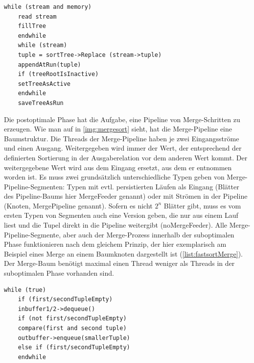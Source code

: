 \documentclass[a4paper,12pt,twoside]{article}
\begin{document}
\begin{minipage}{\linewidth}
	\begin{lstlisting}[caption={Fastsort: Erzeugen der Runs in der Suboptimalen Phase}, label=list:fastsortSub] 
	while (stream and memory) 
	read stream
	fillTree
	endwhile
	while (stream)
	tuple = sortTree->Replace (stream->tuple)
	appendAtRun(tuple)
	if (treeRootIsInactive)
	setTreeAsActive
	endwhile
	saveTreeAsRun
	\end{lstlisting}
\end{minipage}

Die postoptimale Phase hat die Aufgabe, eine Pipeline von Merge-Schritten zu erzeugen. Wie man auf in \autoref{img:mergesort} sieht, hat die Merge-Pipeline eine Baumstruktur. Die Threads der Merge-Pipeline haben je zwei Eingangsströme und einen Ausgang. Weitergegeben wird immer der Wert, der entsprechend der definierten Sortierung in der Ausgaberelation vor dem anderen Wert kommt. Der weitergegebene Wert wird aus dem Eingang ersetzt, aus dem er entnommen worden ist. Es muss zwei grundsätzlich unterschiedliche Typen geben von Merge-Pipeline-Segmenten: Typen mit evtl. persistierten Läufen als Eingang (Blätter des Pipeline-Baums hier MergeFeeder genannt) oder mit Strömen in der Pipeline (Knoten, MergePipeline genannt). Sofern es nicht $2^n$ Blätter gibt, muss es vom ersten Typen von Segmenten auch eine Version geben, die nur aus einem Lauf liest und die Tupel direkt in die Pipeline weitergibt (noMergeFeeder). Alle Merge-Pipeline-Segmente, aber auch der Merge-Prozess innerhalb der suboptimalen Phase funktionieren nach dem gleichem Prinzip, der hier exemplarisch am Beispiel eines Merge an einem Baumknoten dargestellt ist (\autoref{list:fastsortMerge}). Der Merge-Baum benötigt maximal einen Thread weniger als Threads in der suboptimalen Phase vorhanden sind.

\begin{minipage}{\linewidth}
	\begin{lstlisting}[caption={Fastsort: Merge in Pipeline}, label=list:fastsortMerge] 
	while (true)
	if (first/secondTupleEmpty)
	inbuffer1/2->dequeue()
	if (not first/secondTupleEmpty)
	compare(first and second tuple)
	outbuffer->enqueue(smallerTuple)
	else if (first/secondTupleEmpty)
	endwhile
	\end{lstlisting}
\end{minipage}
\end{document}

